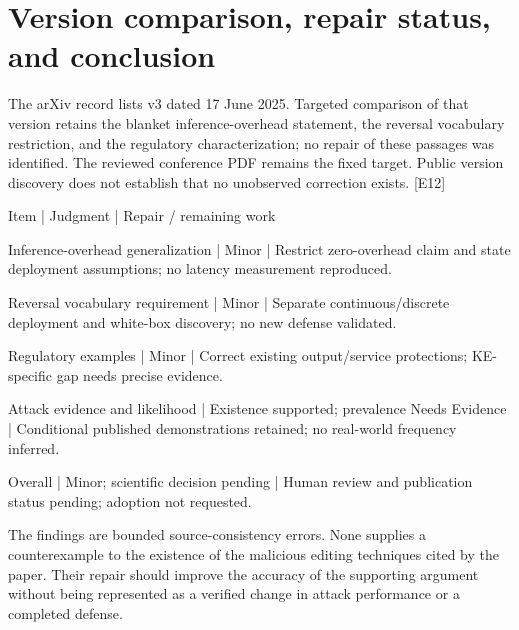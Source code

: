 \documentclass[10pt]{article}
\begin{document}
\section*{Version comparison, repair status, and conclusion}
The arXiv record lists v3 dated 17 June 2025. Targeted comparison of that version retains the blanket inference-overhead statement, the reversal vocabulary restriction, and the regulatory characterization; no repair of these passages was identified. The reviewed conference PDF remains the fixed target. Public version discovery does not establish that no unobserved correction exists. [E12]\par
Item | Judgment | Repair / remaining work\par
Inference-overhead generalization | Minor | Restrict zero-overhead claim and state deployment assumptions; no latency measurement reproduced.\par
Reversal vocabulary requirement | Minor | Separate continuous/discrete deployment and white-box discovery; no new defense validated.\par
Regulatory examples | Minor | Correct existing output/service protections; KE-specific gap needs precise evidence.\par
Attack evidence and likelihood | Existence supported; prevalence Needs Evidence | Conditional published demonstrations retained; no real-world frequency inferred.\par
Overall | Minor; scientific decision pending | Human review and publication status pending; adoption not requested.\par
The findings are bounded source-consistency errors. None supplies a counterexample to the existence of the malicious editing techniques cited by the paper. Their repair should improve the accuracy of the supporting argument without being represented as a verified change in attack performance or a completed defense.\par
\end{document}
